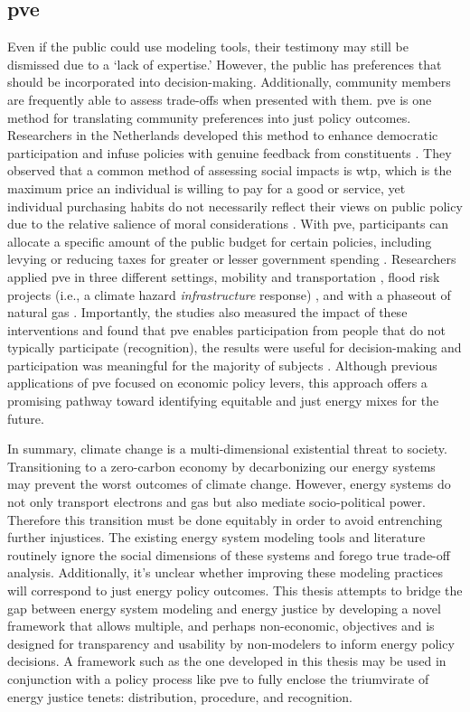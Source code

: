 \subsection{\Acl{pve}}

Even if the public could use modeling tools, their testimony may still be
dismissed due to a `lack of expertise.' However, the public has preferences that
should be incorporated into decision-making. Additionally, community members are
frequently able to assess trade-offs when presented with them. \Acf{pve} is one
method for translating community preferences into just policy outcomes.
Researchers in the Netherlands developed this method to enhance democratic
participation and infuse policies with genuine feedback from constituents
\cite{mouter_introduction_2019}. They observed that a common method of assessing
social impacts is \ac{wtp}, which is the maximum price an individual is willing
to pay for a good or service, yet individual purchasing habits do not
necessarily reflect their views on public policy due to the relative salience of
moral considerations \cite{mouter_introduction_2019}. With \ac{pve},
participants can allocate a specific amount of the public budget for certain
policies, including levying or reducing taxes for greater or lesser government
spending \cite{mouter_introduction_2019}. Researchers applied \ac{pve} in three
different settings, mobility and transportation \cite{mouter_contrasting_2021},
flood risk projects (i.e., a climate hazard \textit{infrastructure} response)
\cite{dekker_economics_2019}, and with a phaseout of natural gas
\cite{mouter_including_2021}. Importantly, the studies also measured the impact
of these interventions and found that \ac{pve} enables participation from people
that do not typically participate (recognition), the results were useful for
decision-making and participation was meaningful for the majority of subjects
\cite{mouter_including_2021}. Although previous applications of \ac{pve} focused
on economic policy levers, this approach offers a promising pathway toward
identifying equitable and just energy mixes for the future.

In summary, climate change is a multi-dimensional existential threat to society.
Transitioning to a zero-carbon economy by decarbonizing our energy systems may
prevent the worst outcomes of climate change. However, energy systems do not
only transport electrons and gas but also mediate socio-political power.
Therefore this transition must be done equitably in order to avoid entrenching
further injustices. The existing energy system modeling tools and literature
routinely ignore the social dimensions of these systems and forego true
trade-off analysis. Additionally, it's unclear whether improving these modeling
practices will correspond to just energy policy outcomes. This thesis attempts
to bridge the gap between energy system modeling and energy justice by
developing a novel framework that allows multiple, and perhaps non-economic,
objectives and is designed for transparency and usability by non-modelers to
inform energy policy decisions. A framework such as the one developed in this
thesis may be used in conjunction with a policy process like \ac{pve} to fully
enclose the triumvirate of energy justice tenets: distribution, procedure, and
recognition.
